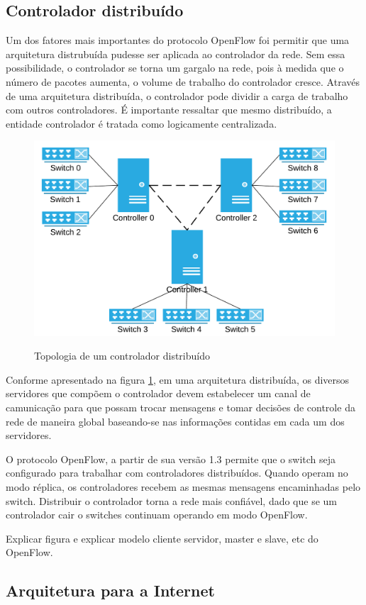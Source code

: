 \subsection{Controlador distribuído}

Um dos fatores mais importantes do protocolo OpenFlow foi permitir que 
uma arquitetura distrubuída pudesse ser aplicada ao controlador da rede.
Sem essa possibilidade, o controlador se torna um gargalo na rede, 
pois à medida que o número de pacotes aumenta, o volume de trabalho do 
controlador cresce. 
Através de uma arquitetura distribuída, o controlador pode dividir a carga 
de trabalho com outros controladores.
É importante ressaltar que mesmo distribuído, a entidade controlador
é tratada como logicamente centralizada.

\begin{figure}[h!]
    \centering
    \includegraphics{img/distributed-controller}
    \label{fig:distributed-controller}
    \caption{Topologia de um controlador distribuído}
\end{figure}

Conforme apresentado na figura \ref{fig:distributed-controller}, em uma
arquitetura distribuída, os diversos servidores que compõem o controlador
devem estabelecer um canal de camunicação para que possam trocar mensagens
e tomar decisões de controle da rede de maneira global baseando-se nas
informações contidas em cada um dos servidores.

O protocolo OpenFlow, a partir de sua versão 1.3 permite que o switch seja 
configurado para trabalhar com controladores distribuídos.
Quando operam no modo réplica, os controladores recebem as mesmas mensagens
encaminhadas pelo switch.
Distribuir o controlador torna a rede mais confiável, dado que se um 
controlador cair o switches continuam operando em modo OpenFlow.

Explicar figura e explicar modelo cliente servidor, master e slave, etc do 
OpenFlow.


\subsection{Arquitetura para a Internet}
